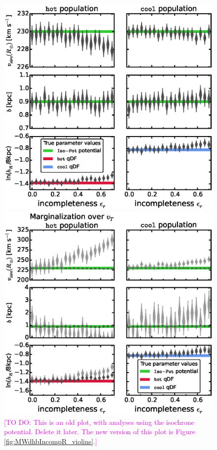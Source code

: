 \documentclass[iop,revtex4]{emulateapj}
\newcommand{\Wilma}[1]{\textcolor{Magenta}{#1}}
\begin{document}
\begin{appendix}
\begin{figure}[!htbp]
\centering
\begin{minipage}{0.48\textwidth}
\centering
\includegraphics[width=\columnwidth]{figs/isoSphFlexIncompR_violins_2.eps}
\caption{\Wilma{[TO DO: This is an old plot, with analyses using the isochrone potential. Delete it later. The new version of this plot is Figure \ref{fig:MWdhbIncompR_violins}.]}}
\label{fig:isoSphFlexIncompR}
\end{minipage}
\hfill
\begin{minipage}{0.48\textwidth}
\centering
\includegraphics[width=\columnwidth]{figs/isoSphFlexIncompR_marginal_violins_3.eps}

\end{minipage}
\end{figure}
\end{appendix}
\end{document}
